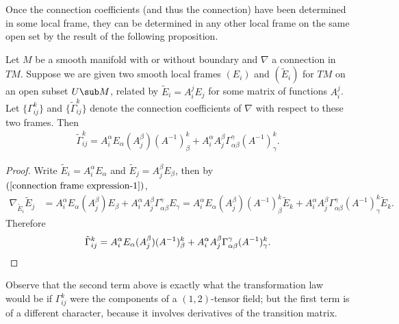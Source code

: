Once the connection coefficients (and thus the connection) have been determined in some local frame, they can be determined in any other local frame on the same open set by the result of the following proposition.
\begin{proposition}\label{connection frame change}
Let $M$ be a smooth manifold with or without boundary and $\nabla$ a connection in $TM$. Suppose we are given two smooth local frames $(E_i)$ and $(\tilde{E}_i)$ for $TM$ on an open subset $U\sub M$, related by $\tilde{E}_i=A_i^jE_j$ for some matrix of functions $A_i^j$. Let $\{\Gamma_{ij}^k\}$ and $\{\tilde{\Gamma}_{ij}^k\}$ denote the connection coefficients of $\nabla$ with respect to these two frames. Then
\begin{align}\label{connection frame change-1}
\tilde{\Gamma}_{ij}^k=A_i^\alpha E_\alpha(A_j^\beta)(A^{-1})_\beta^k+A_{i}^\alpha A_j^\beta\Gamma_{\alpha\beta}^\gamma(A^{-1})_\gamma^k.
\end{align}
\end{proposition}
\begin{proof}
Write $\widetilde{E}_i=A_i^\alpha E_\alpha$ and $\widetilde{E}_j=A_j^\beta E_\beta$, then by $(\ref{connection frame expression-1})$,
\begin{align*}
\nabla_{\widetilde{E}_i}\widetilde{E}_j&=A_i^\alpha E_\alpha(A_j^\beta)E_\beta+A_i^\alpha A_j^\beta\Gamma_{\alpha\beta}^\gamma E_\gamma=A_i^\alpha E_\alpha(A_j^\beta)(A^{-1})_\beta^k\widetilde{E}_k+A_i^\alpha A_j^\beta\Gamma_{\alpha\beta}^\gamma(A^{-1})_\gamma^k\tilde{E}_k.
\end{align*}
Therefore
\begin{equation*}
\tilde{\Gamma}_{ij}^k=A_i^\alpha E_\alpha(A_j^\beta)(A^{-1})_\beta^k+A_{i}^\alpha A_j^\beta\Gamma_{\alpha\beta}^\gamma(A^{-1})_\gamma^k.\qedhere
\end{equation*}
\end{proof}
Observe that the second term above is exactly what the transformation law would be if $\Gamma_{ij}^k$ 
were the components of a $(1,2)$-tensor field; but the first term is of a different character, 
because it involves derivatives of the transition matrix.
